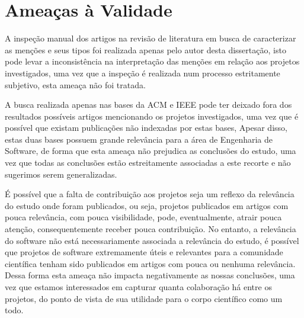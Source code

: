 


%



\section{Ameaças à Validade} %

A inspeção manual dos artigos na revisão de literatura em busca de caracterizar
as menções e seus tipos foi realizada apenas pelo autor desta dissertação, isto
pode levar a inconsistência na interpretação das menções em relação aos projetos
investigados, uma vez que a inspeção é realizada num processo estritamente
subjetivo, esta ameaça não foi tratada.

A busca realizada apenas nas bases da ACM e IEEE pode ter deixado fora dos
resultados possíveis artigos mencionando os projetos investigados, uma vez que
é possível que existam publicações não indexadas por estas bases, Apesar disso,
estas duas bases possuem grande relevância para a área de Engenharia de
Software, de forma que esta ameaça não prejudica as conclusões do estudo, uma
vez que todas as conclusões estão estreitamente associadas a este recorte e não
sugerimos serem generalizadas.

É possível que a falta de contribuição aos projetos seja um reflexo da
relevância do estudo onde foram publicados, ou seja, projetos publicados em
artigos com pouca relevância, com pouca visibilidade, pode, eventualmente,
atrair pouca atenção, consequentemente receber pouca contribuição. No entanto,
a relevância do software não está necessariamente associada a relevância do
estudo, é possível que projetos de software extremamente úteis e relevantes
para a comunidade científica tenham sido publicados em artigos com pouca ou
nenhuma relevância. Dessa forma esta ameaça não impacta negativamente as nossas
conclusões, uma vez que estamos interessados em capturar quanta colaboração há
entre os projetos, do ponto de vista de sua utilidade para o corpo científico
como um todo.

